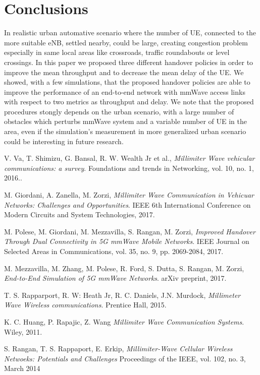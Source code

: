 \documentclass[conference,10pt]{IEEEtran}
\begin{document}
\section{Conclusions}\label{sec:conclusion}
In realistic urban automative scenario where the number of UE, connected to the more suitable eNB, settled nearby, could be large, creating congestion problem especially in same local areas like crossroads, traffic roundabouts or level crossings. In this paper we proposed three different handover policies in order to improve the mean throughput and to decrease the mean delay of the UE.
We showed, with a few simulations, that the proposed handover policies are able to improve
the performance of an end-to-end network with mmWave access links with respect to two metrics as throughput and delay.
We note that the proposed procedures stongly depends on the urban scenario, with a large number of obstacles which perturbs mmWave system and a variable number of UE in the area, even if the simulation's measurement in more generalized urban scenario could be interesting in future research.


\begin{thebibliography}{15}
	
	V. Va, T. Shimizu, G. Bansal, R. W. Wealth Jr et al.,
	\textit{Millimiter Wave vehicular communications: a survey}. 
	Foundations and trends in Networking, vol. 10, no. 1, 2016..
	
	M. Giordani, A. Zanella, M. Zorzi,
	\textit{Millimiter Wave Communication in Vehicuar Networks: Challenges and Opportunities}. 
	IEEE 6th International Conference on Modern Circuits and System Technologies, 2017.
	
	M. Polese, M. Giordani, M. Mezzavilla, S. Rangan, M. Zorzi,
	\textit{Improved Handover Through Dual Connectivity in 5G mmWave Mobile Networks}. 
	IEEE Journal on Selected Areas in Communications, vol. 35, no. 9, pp. 2069-2084, 2017.
	
	M. Mezzavilla, M. Zhang, M. Polese, R. Ford, S. Dutta, S. Rangan, M. Zorzi,
	\textit{End-to-End Simulation of 5G mmWave Networks}. 
	arXiv preprint, 2017.
	
	T. S. Rapparport, R. W: Heath Jr, R. C. Daniels, J.N. Murdock,
	\textit{Millimeter Wave Wireless communications}.
	Prentice Hall, 2015.
	
	K. C. Huang, P. Rapajic, Z. Wang
	\textit{Millimiter Wave Communication Systems}.
	Wiley, 2011.
	
	S. Rangan, T. S. Rappaport, E. Erkip,
	\textit{Millimiter-Wave Cellular Wireless Netwoeks: Potentials and Challenges}
	Proceedings of the IEEE, vol. 102, no. 3, March 2014
	
\end{thebibliography}
\end{document}
